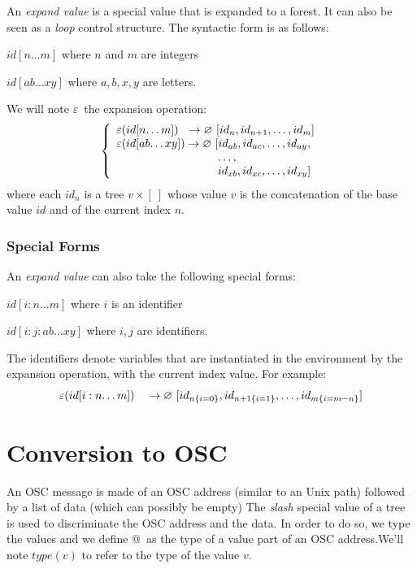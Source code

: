 \documentclass[runningheads,a4paper]{llncs}
\makeatletter
\newcommand{\forest}	{\ensuremath{\varnothing}}
\newcommand{\taddress}	{\ensuremath{\text{@}}}
\newcommand{\etc}		{\ensuremath{\text{…}}}
\newcommand{\emptyf}	{\ensuremath{[\ ]}}
\newcommand{\nexpand}	{\ensuremath{\varepsilon}}
\newcommand{\ulb}		{\hspace*{31.5mm}}
\makeatother
\begin{document}
An \emph{expand value} is a special value that is expanded to a forest. It can also be seen as a \emph{loop} control structure. The syntactic form is as follows:
\begin{description}
\item $id[n\etc m]$ 	where $n$ and $m$ are integers
\item $id[ab\etc xy]$ where $a,b,x,y$ are letters.
\end{description}
We will note \nexpand\ the expansion operation:
\[
\left\{
\begin{array}{l}
	\nexpand(id[n\etc m])   \ \ \to \forest \ [id_n,id_{n+1},\etc ,id_m] \\
	\nexpand(id[ab\etc xy]) \to \forest \ [id_{ab},id_{ac},\etc ,id_{ay}, \\
	\ulb \etc ,\\
	\ulb id_{xb},id_{xc},\etc ,id_{xy}]
\end{array}
\right.
\]
where each $id_n$ is a tree $v \times \emptyf$ whose value $v$ is the concatenation of the base value $id$ and of the current index $n$.

\subsubsection{Special Forms}

An \emph{expand value} can also take the following special forms: 
\begin{description}
\item $id[i:n\etc m]$ 	where $i$ is an identifier
\item $id[i:j:ab\etc xy]$ where $i,j$ are identifiers.
\end{description}
The identifiers denote variables that are instantiated in the environment by the expansion operation, with the current index value. For example:
\[
	\nexpand(id[i:n\etc m])   \quad \to \forest \ [id_{n\{i=0\}},id_{n+1\{i=1\}},\etc ,id_{m\{i=m-n\}}] \\
\]

\section{Conversion to OSC}\label{sslash}

An OSC message is made of an OSC address (similar to an Unix path) followed by a list of data (which can possibly be empty)
The \emph{slash} special value of a tree is used to discriminate the OSC address and the data. In order to do so, we type the values and we define \taddress\ as the type of a value part of an OSC address.We'll note $type(v)$ to refer to the type of the value $v$.
\end{document}

